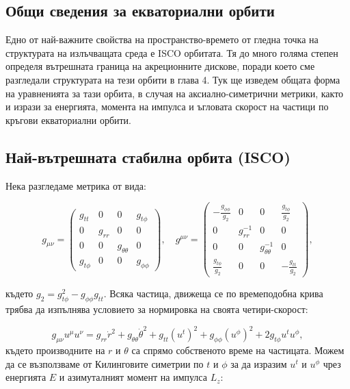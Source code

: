\begin{appendices}
	
	\section{Общи сведения за екваториални орбити}
	
		Едно от най-важните свойства на пространство-времето от гледна точка на структурата на излъчващата среда е ISCO орбитата. Тя до много голяма степен определя вътрешната граница на акреционните дискове, поради което сме разгледали структурата на тези орбити в глава 4. Тук ще изведем общата форма на уравненията за тази орбита, в случая на аксиално-симетрични метрики, както и изрази за енергията, момента на импулса и ъгловата скорост на частици по кръгови екваториални орбити.
		
		\subsection{Най-вътрешната стабилна орбита (ISCO)}
		
		Нека разгледаме метрика от вида:
		
			\begin{equation}
			g_{\mu\nu}=
			\begin{pmatrix}
				g_{tt} & 0 & 0 & g_{t\phi}\\
				0 & g_{rr} & 0 & 0\\
				0 & 0 & g_{\theta\theta} & 0\\
				g_{t\phi} & 0 & 0 & g_{\phi\phi}
			\end{pmatrix}
			,\quad
			g^{\mu\nu}=
			\begin{pmatrix}
				-\frac{g_{\phi\phi}}{g_2} & 0 & 0 & \frac{g_{t\phi}}{g_2}\\
				0 & g_{rr}^{-1} & 0 & 0\\
				0 & 0 & g_{\theta\theta}^{-1} & 0\\
				\frac{g_{t\phi}}{g_2} & 0 & 0 & -\frac{g_{tt}}{g_2}
			\end{pmatrix},
		\end{equation}
	
	където $g_2 = g_{t\phi}^2 - g_{\phi\phi}g_{tt}$. Всяка частица, движеща се по времеподобна крива трябва да изпълнява условието за нормировка на своята четири-скорост:
	
	\begin{equation}
		g_{\mu\nu}u^\mu u^\nu = g_{rr}\dot{r}^2 + g_{\theta\theta}\dot{\theta}^2 + g_{tt}\left(u^t\right)^2 + g_{\phi\phi}\left(u^\phi\right)^2 + 2g_{t\phi}u^tu^\phi,
	\end{equation}
	където производните на $r$ и $\theta$ са спрямо собственото време на частицата. Можем да се възползваме от Килинговите симетрии по $t$ и $\phi$ за да изразим $u^t$ и $u^\phi$ чрез енергията $E$ и азимуталният момент на импулса $L_z$:
	

\end{appendices}
